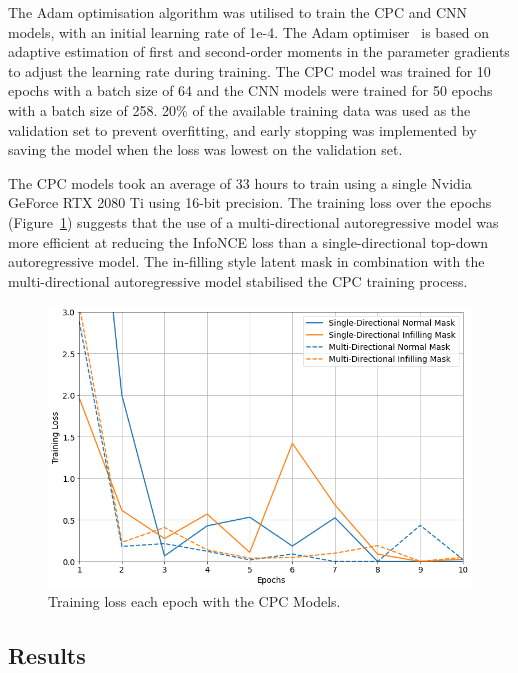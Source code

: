 The Adam optimisation algorithm was utilised to train the CPC and CNN models, with an initial learning rate of 1e-4. The Adam optimiser~\citep{kingma2014adam} is based on adaptive estimation of first and second-order moments in the parameter gradients to adjust the learning rate during training. The CPC model was trained for 10 epochs with a batch size of 64 and the CNN models were trained for 50 epochs with a batch size of 258. 20\% of the available training data was used as the validation set to prevent overfitting, and early stopping was implemented by saving the model when the loss was lowest on the validation set. 

The CPC models took an average of 33 hours to train using a single Nvidia GeForce RTX 2080 Ti using 16-bit precision. The training loss over the epochs (Figure~\ref{fig:cpc_training}) suggests that the use of a multi-directional autoregressive model was more efficient at reducing the InfoNCE loss than a single-directional top-down autoregressive model. The in-filling style latent mask in combination with the multi-directional autoregressive model stabilised the CPC training process.

\begin{figure}[h]
	\centering
	\includegraphics[width=\textwidth]{images/cpc_training.png}
	\caption{Training loss each epoch with the CPC Models.}
	\label{fig:cpc_training}
\end{figure}

\subsection{Results}
\label{subsec:unsupervised_results}

